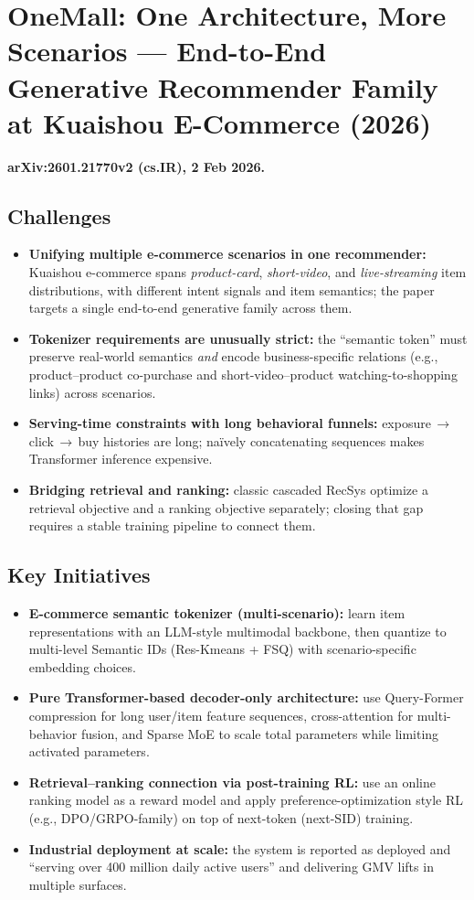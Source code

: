 \documentclass{article}
\begin{document}
\section*{OneMall: One Architecture, More Scenarios --- End-to-End Generative Recommender Family at Kuaishou E-Commerce (2026)}
\textbf{arXiv:2601.21770v2 (cs.IR), 2 Feb 2026.}

\subsection*{Challenges}
\begin{itemize}
  \item \textbf{Unifying multiple e-commerce scenarios in one recommender:} Kuaishou e-commerce spans \emph{product-card}, \emph{short-video}, and \emph{live-streaming} item distributions, with different intent signals and item semantics; the paper targets a single end-to-end generative family across them.
  \item \textbf{Tokenizer requirements are unusually strict:} the ``semantic token'' must preserve real-world semantics \emph{and} encode business-specific relations (e.g., product--product co-purchase and short-video--product watching-to-shopping links) across scenarios.
  \item \textbf{Serving-time constraints with long behavioral funnels:} exposure\,$\rightarrow$\,click\,$\rightarrow$\,buy histories are long; naïvely concatenating sequences makes Transformer inference expensive.
  \item \textbf{Bridging retrieval and ranking:} classic cascaded RecSys optimize a retrieval objective and a ranking objective separately; closing that gap requires a stable training pipeline to connect them.
\end{itemize}

\subsection*{Key Initiatives}
\begin{itemize}
  \item \textbf{E-commerce semantic tokenizer (multi-scenario):} learn item representations with an LLM-style multimodal backbone, then quantize to multi-level Semantic IDs (Res-Kmeans + FSQ) with scenario-specific embedding choices.
  \item \textbf{Pure Transformer-based decoder-only architecture:} use Query-Former compression for long user/item feature sequences, cross-attention for multi-behavior fusion, and Sparse MoE to scale total parameters while limiting activated parameters.
  \item \textbf{Retrieval--ranking connection via post-training RL:} use an online ranking model as a reward model and apply preference-optimization style RL (e.g., DPO/GRPO-family) on top of next-token (next-SID) training.
  \item \textbf{Industrial deployment at scale:} the system is reported as deployed and ``serving over 400 million daily active users'' and delivering GMV lifts in multiple surfaces.
\end{itemize}
\end{document}
